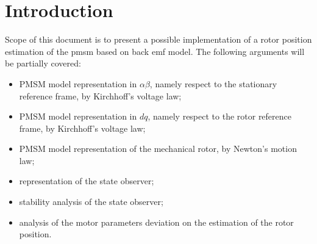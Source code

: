 \documentclass[11pt,a4paper]{article}
\title{\textbf{ 
		\begin{LARGE}
			Permanent Magnet Synchronous Machine
		\end{LARGE} \\[24pt]
		\begin{Large}
			Vector Control, EMF Based Observer
		\end{Large} \\[12pt]
		\begin{large}
			and parameters mismatch analysis 
	\end{large}}
}
\author{\textbf{Davide Bagnara}}
\numberwithin{equation}{section}
\theoremstyle{it}
\theoremstyle{definition}
\begin{document}
	\begin{onehalfspace}
	\thispagestyle{firstpage}
	\begin{mybox}
		\maketitle
		\vspace{120mm}
	\end{mybox}
	\newpage
	\tableofcontents
	\listoffigures	
	\listoftables
	\newpage
	
\section{Introduction}	
Scope of this document is to present a possible implementation of a rotor position estimation of the pmsm based on back emf model. The following arguments will be partially covered:
\begin{itemize}
	\item[--] PMSM model representation in $\alpha\beta$, namely respect to the stationary reference frame, by Kirchhoff's voltage law; 
	\item[--] PMSM model representation in $dq$, namely respect to the rotor reference frame, by Kirchhoff's voltage law; 
	\item[--] PMSM model representation of the mechanical rotor, by Newton's motion law; 
	\item[--] representation of the state observer; 
	\item[--] stability analysis of the state observer; 
	\item[--] analysis of the motor parameters deviation on the estimation of the rotor position. 
\end{itemize}

\end{onehalfspace}
\end{document}
